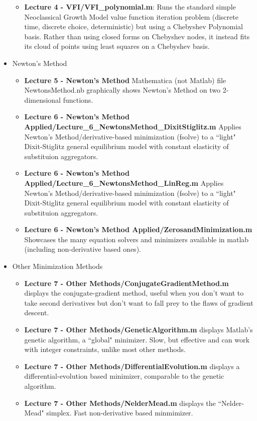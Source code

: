 \documentclass[a4paper]{article}
\begin{document}
\begin{itemize}
\begin{itemize}
\item \textbf{Lecture 4 - VFI/VFI\_polynomial.m}:  Runs the standard simple Neoclassical Growth Model value function iteration problem (discrete time, discrete choice, deterministic) but using a Chebyshev Polynomial basis.  Rather than using closed forms on Chebyshev nodes, it instead fits its cloud of points using least squares on a Chebyshev basis.  
\end{itemize}
\item Newton's Method
\begin{itemize}
\item \textbf{Lecture 5 - Newton's Method} Mathematica (not Matlab) file NewtonsMethod.nb graphically shows Newton's Method on two 2-dimensional functions.
\item \textbf{Lecture 6 - Newton's Method Applied/Lecture\_6\_NewtonsMethod\_DixitStiglitz.m} Applies Newton's Method/derivative-based minimization (fsolve) to a ``light" Dixit-Stiglitz general equilibrium model with constant elasticity of substituion aggregators.
\item \textbf{Lecture 6 - Newton's Method Applied/Lecture\_6\_NewtonsMethod\_LinReg.m} Applies Newton's Method/derivative-based minimization (fsolve) to a ``light" Dixit-Stiglitz general equilibrium model with constant elasticity of substituion aggregators.
\item \textbf{Lecture 6 - Newton's Method Applied/ZerosandMinimization.m} Showcases the many equation solvers and minimizers available in matlab (including non-derivative based ones).
\end{itemize}
\item Other Minimization Methods
\begin{itemize}
\item \textbf{Lecture 7 - Other Methods/ConjugateGradientMethod.m} displays the conjugate-gradient method, useful when you don't want to take second derivatives but don't want to fall prey to the flaws of gradient descent.
\item \textbf{Lecture 7 - Other Methods/GeneticAlgorithm.m} displays Matlab's genetic algorithm, a ``global" minimizer.  Slow, but effective and can work with integer constraints, unlike most other methods.
\item \textbf{Lecture 7 - Other Methods/DifferentialEvolution.m} displays a differential-evolution based minimizer, comparable to the genetic algorithm.
\item \textbf{Lecture 7 - Other Methods/NelderMead.m} displays the ``Nelder-Mead" simplex.  Fast non-derivative based minmimizer.

\end{itemize}
\end{itemize}
\end{document}
